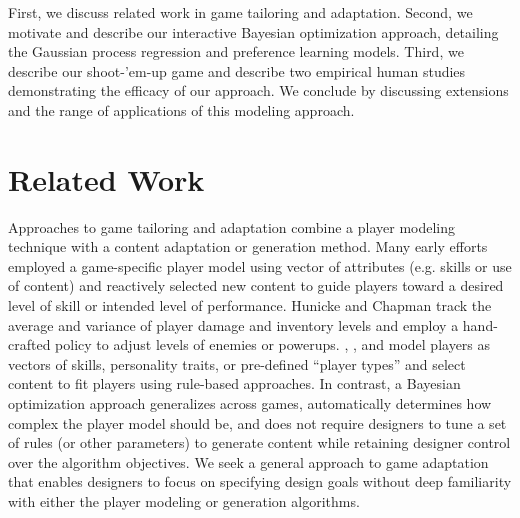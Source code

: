 \documentclass[letterpaper]{article}
\begin{document}

First, we discuss related work in game tailoring and adaptation. Second, we motivate and describe our interactive Bayesian optimization approach, detailing the Gaussian process regression and preference learning models. Third, we describe our shoot-'em-up game and describe two empirical human studies demonstrating the efficacy of our approach. We conclude by discussing extensions and the range of applications of this modeling approach.



\section{Related Work}


Approaches to game tailoring and adaptation combine a player modeling technique with a content adaptation or generation method. Many early efforts employed a game-specific player model using vector of attributes (e.g. skills or use of content) and reactively selected new content to guide players toward a desired level of skill or intended level of performance. Hunicke and Chapman  track the average and variance of player damage and inventory levels and employ a hand-crafted policy to adjust levels of enemies or powerups. \cite{magerko2006:isat}, \cite{el-nasr2007}, and \cite{thue2007:storytell-pm} model players as vectors of skills, personality traits, or pre-defined ``player types'' and select content to fit players using rule-based approaches. In contrast, a Bayesian optimization approach generalizes across games, automatically determines how complex the player model should be, and does not require designers to tune a set of rules (or other parameters) to generate content while retaining designer control over the algorithm objectives. We seek a general approach to game adaptation that enables designers to focus on specifying design goals without deep familiarity with either the player modeling or generation algorithms.
\end{document}

